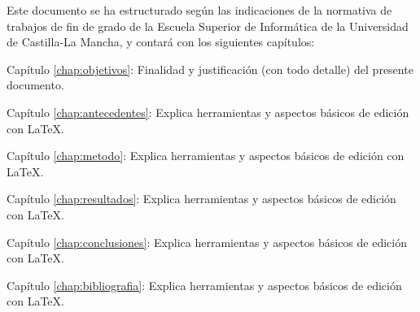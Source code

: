 Este documento se ha estructurado según las indicaciones de la normativa de trabajos de fin de grado de la Escuela Superior de Informática de la Universidad de Castilla-La Mancha, y contará con  los siguientes capítulos:
\begin{definitionlist}
\item[Capítulo \ref{chap:objetivos}: \nameref{chap:objetivos}] Finalidad y justificación  (con todo detalle) del presente documento.
\item[Capítulo \ref{chap:antecedentes}: \nameref{chap:antecedentes}] Explica herramientas y aspectos básicos de edición con \LaTeX.
\item[Capítulo \ref{chap:metodo}: \nameref{chap:antecedentes}] Explica herramientas y aspectos básicos de edición con \LaTeX.
\item[Capítulo \ref{chap:resultados}: \nameref{chap:antecedentes}] Explica herramientas y aspectos básicos de edición con \LaTeX.
\item[Capítulo \ref{chap:conclusiones}: \nameref{chap:antecedentes}] Explica herramientas y aspectos básicos de edición con \LaTeX.
\item[Capítulo \ref{chap:bibliografia}: \nameref{chap:antecedentes}] Explica herramientas y aspectos básicos de edición con \LaTeX.
\end{definitionlist}




